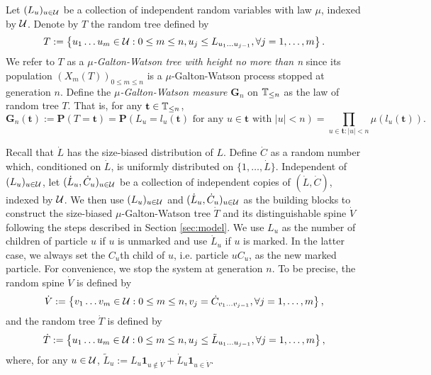 \documentclass[12pt]{amsart}
\numberwithin{equation}{section}
\newcommand{\defn}[1]{{\em #1}}
\newcommand{\ind}[1]{\mathbf 1_{#1}}
\newcommand{\prob}{\mathbf P}
\newcommand{\set}[1]{\left\{ #1 \right\}}
\newcommand{\tree}{\mathbf t}
\newcommand{\bG}{\mathbf G}\newcommand{\bbG}{\mathbb G}\newcommand{\cG}{\mathcal G}
\begin{document}
\par
	Let $(L_u)_{u\in\mathcal U}$ be a collection of independent random variables with law $\mu$, indexed by $\mathcal U$. Denote by $T$ the random tree defined by
\begin{equation*}
		T
	:=
		\set{u_1\dots u_m\in \cU: 0\le m\le n, u_j\leq L_{u_1\dots u_{j-1}},\forall j=1,\dots,m}.
\end{equation*}
We refer to $T$ as a \defn{$\mu$-Galton-Watson tree with height no more than n}
	since its population
		$(X_m(T))_{0\le m\le n}$
is a $\mu$-Galton-Watson process stopped at generation $n$.
	Define the \defn{$\mu$-Galton-Watson measure $\bG_n$} on $\mathbb T_{\leq n}$ as the law of random tree $T$. That is, for any $\tree\in\bbT_{\leq n}$,
\begin{equation*}
		\bG_n(\tree)
    :=
		\prob(T=\tree)
	=
        \prob(L_u=l_u(\tree)\text{ for any } u\in\tree \text{ with }|u|<n)
	=
		\prod_{u\in \tree:|u|<n}\mu(l_u(\tree)).
\end{equation*}
\par
	Recall that $\dot L$ has the size-biased distribution of $L$.
	Define $\dot C$ as a random number which, conditioned on $\dot L$, is uniformly distributed on
	$\{1,\dots,\dot L\}$.
	Independent of $(L_u)_{u\in\mathcal U}$, let $(\dot L_u,\dot C_u)_{u\in \mathcal U}$ be a collection of independent copies of $(\dot L,\dot C)$, indexed by $\mathcal U$.
	We then use $(L_u)_{u\in\mathcal U}$ and $(\dot L_u,\dot C_u)_{u\in\mathcal U}$ as the building blocks to construct the size-biased
$\mu$-Galton-Watson tree $\dot T$ and its distinguishable spine $\dot V$
	following the steps described in Section \ref{sec:model}.
	We use $L_u$ as the number of children of particle $u$ if $u$ is unmarked and use $\dot L_u$ if $u$ is marked.
	In the latter case, we always set the $C_u$th child of $u$, i.e. particle $uC_u$, as the new marked particle.
	For convenience, we stop the system at generation $n$. To be precise, the random spine $\dot V$ is defined by
\begin{equation*}
		\dot V
	:=
		\set{v_1\dots v_m\in \cU:0\le m\le n, v_j=\dot C_{v_1\dots v_{j-1}},\forall j=1,\dots,m},
\end{equation*}
	and the random tree $\dot T$ is defined by
\begin{equation*}
		\dot T
	:=
		\set{u_1\dots u_m\in\cU: 0\le m\le n,u_j\leq \tilde L_{u_1\dots u_{j-1}},\forall j=1,\dots,m},
\end{equation*}
	where, for any $u\in\mathcal U$, $\tilde L_u:=L_u\ind{u\not\in \dot V}+\dot L_u\ind{u\in \dot V}$.
\par
\end{document}
